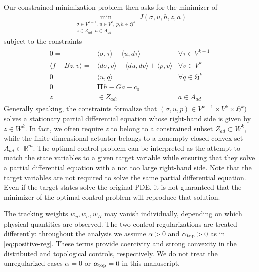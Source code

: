\documentclass{article}
\newcommand{\R} {\mathbb R}
\newcommand{\HH}{\mathfrak H}
\newcommand{\Piop}{\boldsymbol\Pi}
\begin{document}
Our constrained minimization problem then
asks for the minimizer of
\begin{align}\label{eq:pdeconlaplace}
    \min\limits_{\substack{\sigma\in V^{k-1},\,u\in V^k,\,p,h\in\HH^k\\ z\in Z_{ad},\,a\in A_{ad}}}
    J(\sigma,u,h,z,a)
\end{align}
subject to the constraints
\begin{align}\label{eq:pdeconlaplace:constraints}
	\begin{array}{rll}
		0
		=
		 &
		\langle \sigma, \tau \rangle - \langle u, d \tau \rangle
		 &
		\forall \tau \in V^{k-1}
		\\
		\langle f+Bz,v \rangle
		=
		 &
		\langle d\sigma,v \rangle + \langle du,dv \rangle + \langle p,v \rangle
		 &
		\forall v \in V^k
		\\
		0 =
		 &
		\langle u, q \rangle
		 &
		\forall q \in \mathfrak H^k
		\\
        0 = & \Piop h-Ga-c_0 \\
        z & \in Z_{ad}, & a\in A_{ad}
	\end{array}
\end{align}
Generally speaking, the constraints formalize that $(\sigma,u,p) \in V^{k-1} \times V^k \times \mathfrak{H}^k)$ solves a stationary partial differential equation whose right-hand side is given by $z \in W^k$.
In fact, we often require $z$ to belong to a constrained subset $Z_{ad}\subset W^k$, while the finite-dimensional actuator belongs to a nonempty closed convex set $A_{ad}\subset\R^m$.
The optimal control problem can be interpreted as the attempt to match the state variables to a given target variable while ensuring that they solve a partial differential equation with a not too large right-hand side.
Note that the target variables are not required to solve the same partial differential equation. Even if the target states solve the original PDE, it is not guaranteed that the minimizer of the optimal control problem will reproduce that solution.

The tracking weights $w_y,w_\sigma,w_\Pi$ may vanish individually, depending on which physical quantities are observed.  The two control regularizations are treated differently: throughout the analysis we assume $\alpha>0$ and $\alpha_{\rm top}>0$ as in \eqref{eq:positive-reg}.  These terms provide coercivity and strong convexity in the distributed and topological controls, respectively.  We do not treat the unregularized cases $\alpha=0$ or $\alpha_{\rm top}=0$ in this manuscript.
\end{document}

